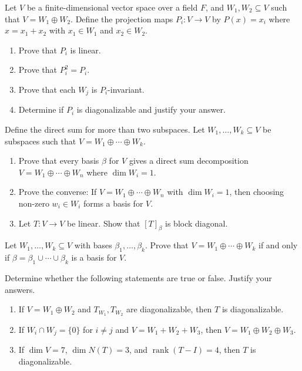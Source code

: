 \documentclass{eh-homework}
\begin{document}
    \begin{question}{8}
    Let $V$ be a finite-dimensional vector space over a field $F$, and $W_1, W_2 \subseteq V$ such that $V = W_1 \oplus W_2$. Define the projection maps $P_i : V \to V$ by $P(x) = x_i$ where $x = x_1 + x_2$ with $x_1 \in W_1$ and $x_2 \in W_2$.
    
    \begin{enumerate}
        \item Prove that $P_i$ is linear.
        \item Prove that $P_i^2 = P_i$.
        \item Prove that each $W_j$ is $P_i$-invariant.
        \item Determine if $P_i$ is diagonalizable and justify your answer.
    \end{enumerate}
    \end{question}
    
    \begin{question}{9}
    Define the direct sum for more than two subspaces. Let $W_1, \ldots, W_k \subseteq V$ be subspaces such that $V = W_1 \oplus \cdots \oplus W_k$.
    
    \begin{enumerate}
        \item Prove that every basis $\beta$ for $V$ gives a direct sum decomposition $V = W_1 \oplus \cdots \oplus W_n$ where $\dim W_i = 1$.
        \item Prove the converse: If $V = W_1 \oplus \cdots \oplus W_n$ with $\dim W_i = 1$, then choosing non-zero $w_i \in W_i$ forms a basis for $V$.
        \item Let $T : V \to V$ be linear. Show that $[T]_\beta$ is block diagonal.
    \end{enumerate}
    \end{question}
    
    \begin{question}{10}
    Let $W_1, \ldots, W_k \subseteq V$ with bases $\beta_1, \ldots, \beta_k$. Prove that $V = W_1 \oplus \cdots \oplus W_k$ if and only if $\beta = \beta_1 \cup \cdots \cup \beta_k$ is a basis for $V$.
    \end{question}
    
    \begin{question}{11}
    Determine whether the following statements are true or false. Justify your answers.
    
    \begin{enumerate}
        \item If $V = W_1 \oplus W_2$ and $T_{W_1}, T_{W_2}$ are diagonalizable, then $T$ is diagonalizable.
        \item If $W_i \cap W_j = \{0\}$ for $i \neq j$ and $V = W_1 + W_2 + W_3$, then $V = W_1 \oplus W_2 \oplus W_3$.
        \item If $\dim V = 7$, $\dim N(T) = 3$, and $\operatorname{rank}(T - I) = 4$, then $T$ is diagonalizable.
    \end{enumerate}
    \end{question}
\end{document}
